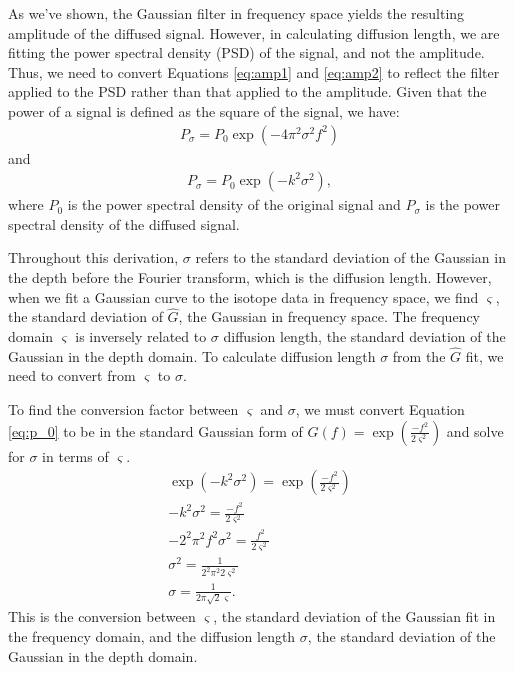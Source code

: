 \documentclass[draft, jgrga]{AGUTeX}
\begin{document}
\begin{article}
As we've shown, the Gaussian filter in frequency space yields the resulting amplitude of the diffused signal. However, in calculating diffusion length, we are fitting the power spectral density (PSD) of the signal, and not the amplitude. Thus, we need to convert Equations \ref{eq:amp1} and \ref{eq:amp2} to reflect the filter applied to the PSD rather than that applied to the amplitude. Given that the power of a signal is defined as the square of the signal, we have:
\begin{eqnarray}
  P_\sigma = P_0 \exp \left(-4\pi^2\sigma^2f^2\right)
\end{eqnarray}
and
\begin{eqnarray}
  \label{eq:p_0}
  P_\sigma = P_0 \exp \left(-k^2 \sigma^2\right),
\end{eqnarray}
where $P_0$ is the power spectral density of the original signal and $P_\sigma$ is the power spectral density of the diffused signal.

Throughout this derivation, $\sigma$ refers to the standard deviation of the Gaussian in the depth before the Fourier transform, which is the diffusion length. However, when we fit a Gaussian curve to the isotope data in frequency space, we find $\varsigma$, the standard deviation of $\hat{G}$, the Gaussian in frequency space. The frequency domain $\varsigma$ is inversely related to $\sigma$ diffusion length, the standard deviation of the Gaussian in the depth domain. To calculate diffusion length $\sigma$ from the $\hat{G}$ fit, we need to convert from $\varsigma$ to $\sigma$.

To find the conversion factor between $\varsigma$ and $\sigma$, we must convert Equation \ref{eq:p_0} to be in the standard Gaussian form of $G(f) = \exp\left(\frac{-f^{2}}{2\varsigma^{2}}\right)$ and solve for $\sigma$ in terms of $\varsigma$.
\begin{eqnarray}
  \exp\left(-k^{2}\sigma^{2}\right) = \exp\left(\frac{-f^{2}}{2\varsigma^{2}}\right)\\
  -k^{2}\sigma^{2} = \frac{-f^{2}}{2\varsigma^{2}}\\
  -2^{2}\pi^{2}f^{2}\sigma^{2} = \frac{f^{2}}{2\varsigma^{2}} \\
  \sigma^{2} = \frac{1}{2^{2}\pi^{2}2\varsigma^{2}} \\
  \sigma = \frac{1}{2\pi\sqrt{2}\varsigma}.
\end{eqnarray}
This is the conversion between $\varsigma$, the standard deviation of the Gaussian fit in the frequency domain, and the diffusion length $\sigma$, the standard deviation of the Gaussian in the depth domain.


\end{article}
\end{document}
